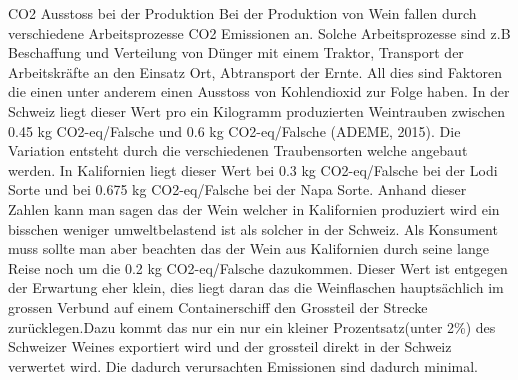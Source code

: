 CO2 Ausstoss bei der Produktion
Bei der Produktion von Wein fallen durch verschiedene Arbeitsprozesse CO2 Emissionen an. Solche Arbeitsprozesse sind z.B Beschaffung und Verteilung von Dünger mit einem Traktor, Transport der Arbeitskräfte an den Einsatz Ort, Abtransport der Ernte. All dies sind Faktoren die einen unter anderem einen Ausstoss von Kohlendioxid zur Folge haben. In der Schweiz liegt dieser Wert pro ein Kilogramm produzierten Weintrauben zwischen 0.45 kg CO2-eq/Falsche und 0.6 kg CO2-eq/Falsche (ADEME, 2015). Die Variation entsteht durch die verschiedenen Traubensorten welche angebaut werden. In Kalifornien liegt dieser Wert bei 0.3 kg CO2-eq/Falsche bei der Lodi Sorte und bei 0.675 kg CO2-eq/Falsche bei der Napa Sorte.
Anhand dieser Zahlen kann man sagen das der Wein welcher in Kalifornien produziert wird ein bisschen weniger umweltbelastend ist als solcher in der Schweiz. Als Konsument muss sollte man aber beachten das der Wein aus Kalifornien durch seine lange Reise noch um die 0.2 kg CO2-eq/Falsche dazukommen. Dieser Wert ist entgegen der Erwartung eher klein, dies liegt daran das die Weinflaschen hauptsächlich im grossen Verbund auf einem Containerschiff den Grossteil der Strecke zurücklegen.Dazu kommt das nur ein nur ein kleiner Prozentsatz(unter 2\%) des Schweizer Weines exportiert wird und der grossteil direkt in der Schweiz verwertet wird. Die dadurch verursachten Emissionen sind dadurch minimal. 